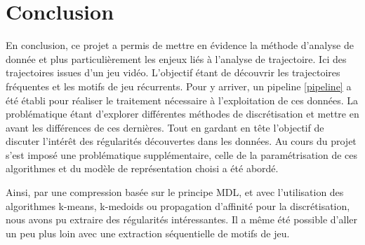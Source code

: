 \chapter{Conclusion}


En conclusion, ce projet a permis de mettre en évidence la méthode d'analyse de donnée et plus particulièrement les enjeux liés à l'analyse de trajectoire. Ici des trajectoires issues d'un jeu vidéo. L'objectif étant de découvrir les trajectoires fréquentes et les motifs de jeu récurrents. Pour y arriver, un pipeline \ref{pipeline} a été établi pour réaliser le traitement nécessaire à l'exploitation de ces données. La problématique étant d'explorer différentes méthodes de discrétisation et mettre en avant les différences de ces dernières. Tout en gardant en tête l'objectif de discuter l'intérêt des régularités découvertes dans les données. Au cours du projet s'est imposé une problématique supplémentaire, celle de la paramétrisation de ces algorithmes et du modèle de représentation choisi a été abordé.  

Ainsi, par une compression basée sur le principe MDL, et avec l'utilisation des algorithmes k-means, k-medoids ou propagation d'affinité pour la discrétisation, nous avons pu extraire des régularités intéressantes. Il a même été possible d'aller un peu plus loin avec une extraction séquentielle de motifs de jeu. 


    


